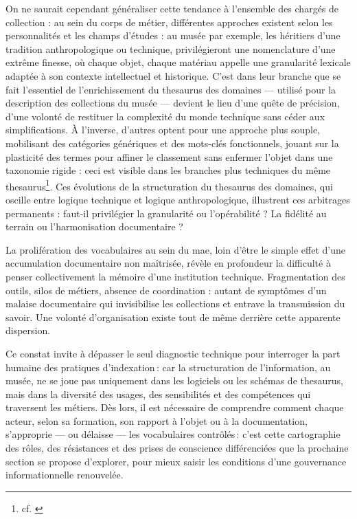 On ne saurait cependant généraliser cette tendance à l'ensemble des chargés de collection : au sein du corps de métier, différentes approches existent selon les personnalités et les champs d'études : au musée par exemple, les héritiers d’une tradition anthropologique ou technique, privilégieront une nomenclature d’une extrême finesse, où chaque objet, chaque matériau appelle une granularité lexicale adaptée à son contexte intellectuel et historique. C'est dans leur branche que se fait l'essentiel de l’enrichissement du \gls{thesaurus} des domaines — utilisé pour la description des collections du musée — devient le lieu d’une quête de précision, d’une volonté de restituer la complexité du monde technique sans céder aux simplifications. À l’inverse, d’autres optent pour une approche plus souple, mobilisant des catégories génériques et des mots-clés fonctionnels, jouant sur la plasticité des termes pour affiner le classement sans enfermer l’objet dans une taxonomie rigide : ceci est visible dans les branches plus techniques du même \gls{thesaurus}\footnote{cf. \textit{\hyperref[fig:model_domaines]{}}}. Ces évolutions de la structuration du \gls{thesaurus} des domaines, qui oscille entre logique technique et logique anthropologique, illustrent ces arbitrages permanents : faut-il privilégier la granularité ou l’opérabilité ? La fidélité au terrain ou l’harmonisation documentaire ?

La prolifération des vocabulaires au sein du \acf{mae}, loin d’être le simple effet d’une accumulation documentaire non maîtrisée, révèle en profondeur la difficulté à penser collectivement la mémoire d’une institution technique. Fragmentation des outils, silos de métiers, absence de coordination : autant de symptômes d’un malaise documentaire qui invisibilise les collections et entrave la transmission du savoir. Une volonté d'organisation existe tout de même derrière cette apparente dispersion.

\bigskip

Ce constat invite à dépasser le seul diagnostic technique pour interroger la part humaine des pratiques d’indexation : car la structuration de l’information, au musée, ne se joue pas uniquement dans les logiciels ou les schémas de \gls{thesaurus}, mais dans la diversité des usages, des sensibilités et des compétences qui traversent les métiers. Dès lors, il est nécessaire de comprendre comment chaque acteur, selon sa formation, son rapport à l’objet ou à la documentation, s’approprie — ou délaisse — les vocabulaires contrôlés : c’est cette cartographie des rôles, des résistances et des prises de conscience différenciées que la prochaine section se propose d’explorer, pour mieux saisir les conditions d’une gouvernance informationnelle renouvelée.